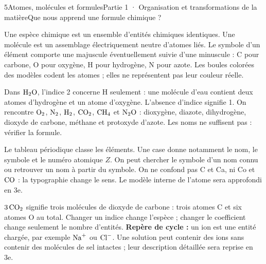 \begin{ouverture}[college1]{5}{Atomes, molécules et formules}{Partie 1 · Organisation et transformations de la matière}{Que nous apprend une formule chimique ?}
\end{ouverture}
\label{ess-5}
Une espèce chimique est un ensemble d’entités chimiques identiques. Une molécule est un assemblage électriquement neutre d’atomes liés. Le symbole d’un élément comporte une majuscule éventuellement suivie d’une minuscule : C pour carbone, O pour oxygène, H pour hydrogène, N pour azote. Les boules colorées des modèles codent les atomes ; elles ne représentent pas leur couleur réelle.\par
{}
Dans $\ce{H2O}$, l’indice 2 concerne H seulement : une molécule d’eau contient deux atomes d’hydrogène et un atome d’oxygène. L’absence d’indice signifie 1. On rencontre $\ce{O2}$, $\ce{N2}$, $\ce{H2}$, $\ce{CO2}$, $\ce{CH4}$ et $\ce{N2O}$ : dioxygène, diazote, dihydrogène, dioxyde de carbone, méthane et protoxyde d’azote. Les noms ne suffisent pas : vérifier la formule.\par
\clearpage
{}
Le tableau périodique classe les éléments. Une case donne notamment le nom, le symbole et le numéro atomique $Z$. On peut chercher le symbole d’un nom connu ou retrouver un nom à partir du symbole. On ne confond pas C et Ca, ni Co et $\ce{CO}$ : la typographie change le sens. Le modèle interne de l’atome sera approfondi en 3e.\par
{}
$3\,\ce{CO2}$ signifie trois molécules de dioxyde de carbone : trois atomes C et six atomes O au total. Changer un indice change l’espèce ; changer le coefficient change seulement le nombre d’entités. \textbf{Repère de cycle :} un ion est une entité chargée, par exemple $\ce{Na+}$ ou $\ce{Cl-}$. Une solution peut contenir des ions sans contenir des molécules de sel intactes ; leur description détaillée sera reprise en 3e.\par
